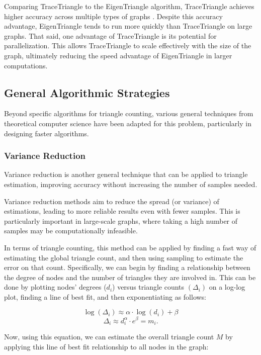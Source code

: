 \documentclass[11pt]{article}
\begin{document}
Comparing TraceTriangle to the EigenTriangle algorithm, TraceTriangle achieves higher accuracy across multiple types of graphs \cite{avron_counting_2010}.
Despite this accuracy advantage, EigenTriangle tends to run more quickly than TraceTriangle on large graphs.
That said, one advantage of TraceTriangle is its potential for parallelization.
This allows TraceTriangle to scale effectively with the size of the graph, ultimately reducing the speed advantage of EigenTriangle in larger computations.

\subsection{General Algorithmic Strategies}

Beyond specific algorithms for triangle counting, various general techniques from theoretical computer science have been adapted for this problem, particularly in designing faster algorithms.

\subsubsection{Variance Reduction}
\label{sec:variance-reduction-background}

Variance reduction \cite{prescott_monte_1965} is another general technique that can be applied to triangle estimation, improving accuracy without increasing the number of samples needed.

Variance reduction methods aim to reduce the spread (or variance) of estimations, leading to more reliable results even with fewer samples.
This is particularly important in large-scale graphs, where taking a high number of samples may be computationally infeasible.

In terms of triangle counting, this method can be applied by finding a fast way of estimating the global triangle count, and then using sampling to estimate the error on that count.
Specifically, we can begin by finding a relationship between the degree of nodes and the number of triangles they are involved in.
This can be done by plotting nodes' degrees ($d_i$) versus triangle counts $(\Delta_i)$ on a log-log plot, finding a line of best fit, and then exponentiating as follows:

\[
\log(\Delta_i) \approx \alpha \cdot \log(d_i) + \beta
\]
\[
\Delta_i \approx d_i^\alpha \cdot e^\beta = m_i.
\]

Now, using this equation, we can estimate the overall triangle count $M$ by applying this line of best fit relationship to all nodes in the graph:
\end{document}
